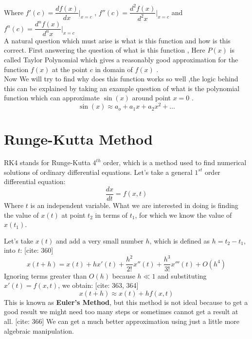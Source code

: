 \documentclass[10pt,twoside]{report}
\begin{document}
Where \qquad
$ f'(c) = \dfrac{df(x)}{dx}\bigg|_{x=c} $ , $f''(c) = \dfrac{d^2f(x)}{d^2x}\bigg|_{x=c}$ and $ f^n(c) = \dfrac{d^nf(x)}{d^nx}\bigg|_{x=c} $ \\

A natural question which must arise is what is this function and how is this correct. First answering the question of what is this function , Here $P(x)$ is called Taylor Polynomial which gives a reasonably good approximation for the function $f(x)$ at the point $c$ in domain of $f(x)$ .\\
Now We will try to find why does this function works so well ,the logic behind this can be explained by taking an example question of what is the polynomial function which can approximate $\sin(x)$ around point $x=0$ . $$\sin(x) \approx  a_o + a_1x +a_2 x^2 +\ldots $$      %
\section{Runge-Kutta Method}
RK4 stands for Runge-Kutta $4^{th}$ order, which is a method used to find numerical solutions of ordinary differential equations. Let's take a general $1^{st}$ order differential equation:
\begin{equation*}
    \dfrac{dx}{dt} = f(x,t)
\end{equation*}
Where $t$ is an independent variable. What we are interested in doing is finding the value of $x(t)$ at point $t_2$ in terms of $t_1$, for which we know the value of $x(t_1)$. 

Let's take $x(t)$ and add a very small number $h$, which is defined as $h = t_2 - t_1$, into $t$: [cite: 360]
\begin{equation*}
    x(t+h) = x(t) + h x'(t) + \dfrac{h^2}{2!}x''(t) + \dfrac{h^3}{3!}x'''(t) + O(h^4) \tag{from Taylor expansion}
\end{equation*}
Ignoring terms greater than $O(h)$ because $h \ll 1$ and substituting $x'(t) = f(x,t)$, we obtain: [cite: 363, 364]
\begin{equation}
\label{euler_method}
    x(t+h) \approx x(t) + h f(x,t)
\end{equation}
This is known as \textbf{Euler's Method}, but this method is not ideal because to get a good result we might need too many steps or sometimes cannot get a result at all. [cite: 366] We can get a much better approximation using just a little more algebraic manipulation. 
\end{document}
